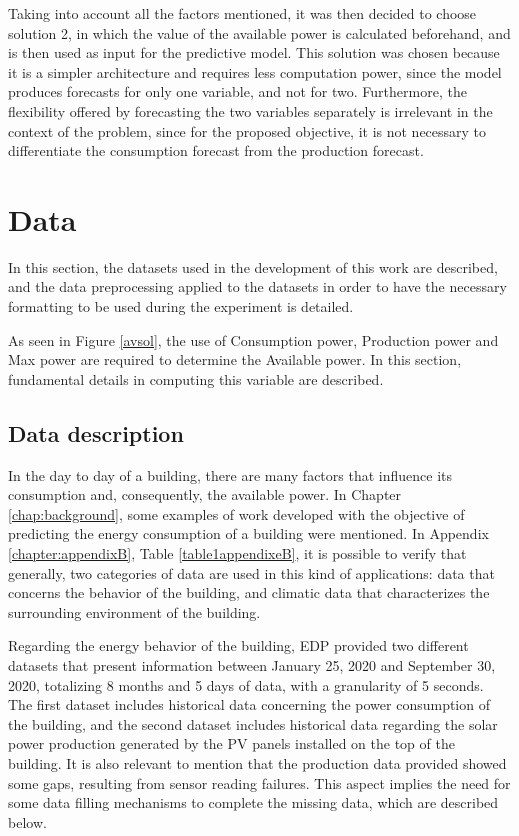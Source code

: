 Taking into account all the factors mentioned, it was then decided to choose solution 2, in which the value of the available power is calculated beforehand, and is then used as input for the predictive model. This solution was chosen because it is a simpler architecture and requires less computation power, since the model produces forecasts for only one variable, and not for two. Furthermore, the flexibility offered by forecasting the two variables separately is irrelevant in the context of the problem, since for the proposed objective, it is not necessary to differentiate the consumption forecast from the production forecast. 

\section{Data}\label{chap3:sec:data}

In this section, the datasets used in the development of this work are described, and the data preprocessing applied to the datasets in order to have the necessary formatting to be used during the experiment is detailed.

As seen in Figure \ref{avsol}, the use of Consumption power, Production power and Max power are required to determine the Available power. In this section, fundamental details in computing this variable are described.

\subsection{Data description}\label{chap3:subsec:data_description}

In the day to day of a building, there are many factors that influence its consumption and, consequently, the available power. In Chapter \ref{chap:background}, some examples of work developed with the objective of predicting the energy consumption of a building were mentioned. In Appendix \ref{chapter:appendixB}, Table \ref{table1appendixeB}, it is possible to verify that generally, two categories of data are used in this kind of applications: data that concerns the behavior of the building, and climatic data that characterizes the surrounding environment of the building.

Regarding the energy behavior of the building, \ac{EDP} provided two different datasets that present information between January 25, 2020 and September 30, 2020, totalizing 8 months and 5 days of data, with a granularity of 5 seconds. The first dataset includes historical data concerning the power consumption of the building, and the second dataset includes historical data regarding the solar power production generated by the \ac{PV} panels installed on the top of the building. It is also relevant to mention that the production data provided showed some gaps, resulting from sensor reading failures. This aspect implies the need for some data filling mechanisms to complete the missing data, which are described below.

